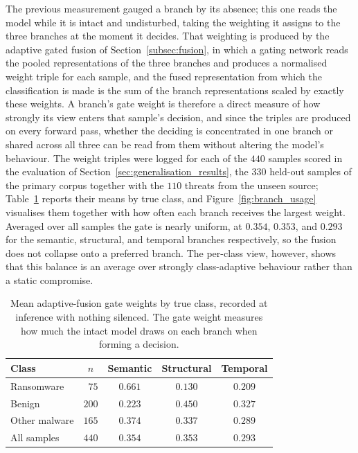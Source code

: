 \documentclass[%
    BCOR=10mm,
    DIV=13,
    toc=bibliography,
    toc=listof,
    oneside,
    12pt,
]{scrbook}
\begin{document}
The previous measurement gauged a branch by its absence; this one reads the
model while it is intact and undisturbed, taking the weighting it assigns to
the three branches at the moment it decides. That weighting is produced by the
adaptive gated fusion of Section~\ref{subsec:fusion}, in which a gating network
reads the pooled representations of the three branches and produces a
normalised weight triple for each sample, and the fused representation from
which the classification is made is the sum of the branch representations
scaled by exactly these weights. A branch's gate weight is therefore a direct
measure of how strongly its view enters that sample's decision, and since the
triples are produced on every forward pass, whether the deciding is
concentrated in one branch or shared across all three can be read from them
without altering the model's behaviour. The weight triples were logged for each
of the $440$ samples scored in the evaluation of
Section~\ref{sec:generalisation_results}, the $330$ held-out samples of the
primary corpus together with the $110$ threats from the unseen source;
Table~\ref{tab:gate_weights} reports their means by true class, and
Figure~\ref{fig:branch_usage} visualises them together with how often each
branch receives the largest weight. Averaged over all samples the gate is
nearly uniform, at $0.354$, $0.353$, and $0.293$ for the semantic, structural,
and temporal branches respectively, so the fusion does not collapse onto a
preferred branch. The per-class view, however, shows that this balance is an
average over strongly class-adaptive behaviour rather than a static compromise.

\begin{table}[htbp]
\centering
\caption[Mean gate weights by true class]{Mean adaptive-fusion gate weights by true class, recorded at inference
with nothing silenced. The gate weight measures how much the intact model draws
on each branch when forming a decision.}
\label{tab:gate_weights}
\begin{tabular}{l r ccc}
\toprule
\textbf{Class} & \multicolumn{1}{c}{$n$} & \textbf{Semantic} & \textbf{Structural} & \textbf{Temporal} \\
\midrule
Ransomware    & $75$  & $0.661$ & $0.130$ & $0.209$ \\
Benign        & $200$ & $0.223$ & $0.450$ & $0.327$ \\
Other malware & $165$ & $0.374$ & $0.337$ & $0.289$ \\
\midrule
All samples   & $440$ & $0.354$ & $0.353$ & $0.293$ \\
\bottomrule
\end{tabular}
\end{table}
\end{document}
